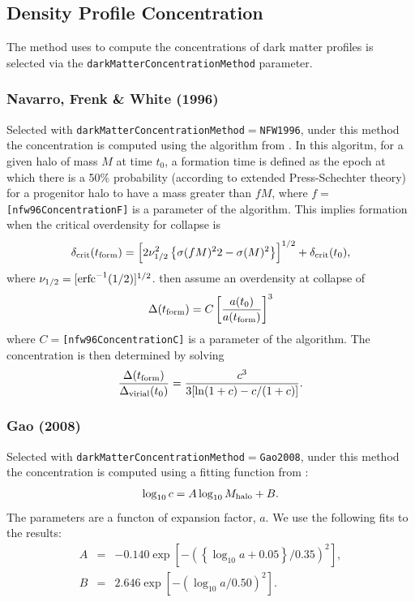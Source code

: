 \subsection{Density Profile Concentration}\label{sec:DarkMatterProfileConcentration}

The method uses to compute the concentrations of dark matter profiles is selected via the {\tt darkMatterConcentrationMethod} parameter.

\subsubsection{Navarro, Frenk \& White (1996)}

Selected with {\tt darkMatterConcentrationMethod}$=${\tt NFW1996}, under this method the concentration is computed using the algorithm from \cite{navarro_structure_1996}. In this algoritm, for a given halo of mass $M$ at time $t_0$, a formation time is defined as the epoch at which there is a 50\% probability (according to extended Press-Schechter theory) for a progenitor halo to have a mass greater than $fM$, where $f=${\tt [nfw96ConcentrationF]} is a parameter of the algorithm. This implies formation when the critical overdensity for collapse is
\begin{equation}
 \delta_{\rm crit}(t_{\rm form}) = \left[ 2 \nu_{1/2}^2 \left\{\sigma(fM)^22-\sigma(M)^2\right\} \right]^{1/2}+\delta_{\rm crit}(t_0),
\end{equation}
where $\nu_{1/2} = [\hbox{erfc}^{-1}(1/2)]^{1/2}$. \cite{navarro_structure_1996} then assume an overdensity at collapse of 
\begin{equation}
 \Delta(t_{\rm form}) = C  \left[ {a(t_0) \over a(t_{\rm form})} \right]^3
\end{equation}
where $C=${\tt [nfw96ConcentrationC]} is a parameter of the algorithm. The concentration is then determined by solving
\begin{equation}
 {\Delta(t_{\rm form}) \over \Delta_{\rm virial}(t_0)} = {c^3 \over 3 [\ln(1+c)-c/(1+c)]}.
\end{equation}

\subsubsection{Gao (2008)}

Selected with {\tt darkMatterConcentrationMethod}$=${\tt Gao2008}, under this method the concentration is computed using a fitting function from \cite{gao_redshift_2008}:
\begin{equation}
\log_{10} c = A \log_{10} M_{\rm halo} + B.
\end{equation}
The parameters are a functon of expansion factor, $a$. We use the following fits to the \cite{gao_redshift_2008} results:
\begin{eqnarray}
A &=& -0.140 \exp\left[-\left(\left\{\log_{10}a+0.05\right\}/0.35\right)^2\right], \\
B &=&  2.646 \exp\left[-\left(\log_{10}a/0.50\right)^2\right].
\end{eqnarray}

